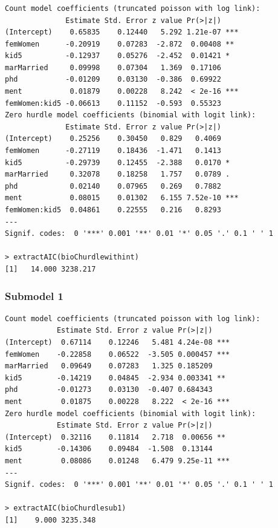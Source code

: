 \documentclass{beamer}
\begin{document}
\begin{frame}[fragile]
\frametitle{}
{\scriptsize
\begin{verbatim}
Count model coefficients (truncated poisson with log link):
              Estimate Std. Error z value Pr(>|z|)    
(Intercept)    0.65835    0.12440   5.292 1.21e-07 ***
femWomen      -0.20919    0.07283  -2.872  0.00408 ** 
kid5          -0.12937    0.05276  -2.452  0.01421 *  
marMarried     0.09998    0.07304   1.369  0.17106    
phd           -0.01209    0.03130  -0.386  0.69922    
ment           0.01879    0.00228   8.242  < 2e-16 ***
femWomen:kid5 -0.06613    0.11152  -0.593  0.55323    
Zero hurdle model coefficients (binomial with logit link):
              Estimate Std. Error z value Pr(>|z|)    
(Intercept)    0.25256    0.30450   0.829   0.4069    
femWomen      -0.27119    0.18436  -1.471   0.1413    
kid5          -0.29739    0.12455  -2.388   0.0170 *  
marMarried     0.32078    0.18258   1.757   0.0789 .  
phd            0.02140    0.07965   0.269   0.7882    
ment           0.08015    0.01302   6.155 7.52e-10 ***
femWomen:kid5  0.04861    0.22555   0.216   0.8293    
---
Signif. codes:  0 '***' 0.001 '**' 0.01 '*' 0.05 '.' 0.1 ' ' 1 

> extractAIC(bioChurdlewithint)
[1]   14.000 3238.217
\end{verbatim}
}
\end{frame}

\begin{frame}[fragile]
\frametitle{Submodel 1}

{\scriptsize
\begin{verbatim}
Count model coefficients (truncated poisson with log link):
            Estimate Std. Error z value Pr(>|z|)    
(Intercept)  0.67114    0.12246   5.481 4.24e-08 ***
femWomen    -0.22858    0.06522  -3.505 0.000457 ***
marMarried   0.09649    0.07283   1.325 0.185209    
kid5        -0.14219    0.04845  -2.934 0.003341 ** 
phd         -0.01273    0.03130  -0.407 0.684343    
ment         0.01875    0.00228   8.222  < 2e-16 ***
Zero hurdle model coefficients (binomial with logit link):
            Estimate Std. Error z value Pr(>|z|)    
(Intercept)  0.32116    0.11814   2.718  0.00656 ** 
kid5        -0.14306    0.09484  -1.508  0.13144    
ment         0.08086    0.01248   6.479 9.25e-11 ***
---
Signif. codes:  0 '***' 0.001 '**' 0.01 '*' 0.05 '.' 0.1 ' ' 1 

> extractAIC(bioChurdlesub1)
[1]    9.000 3235.348
\end{verbatim}
}

\end{frame}
\end{document}
